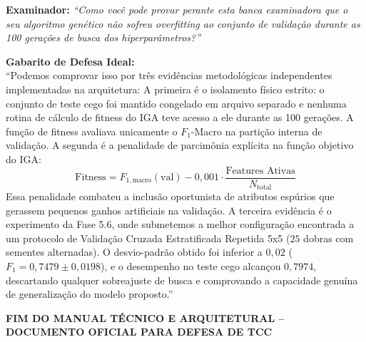 \documentclass[10pt,a4paper]{article}
\begin{document}
\begin{alertbox}
\textbf{Examinador:} \textit{``Como você pode provar perante esta banca examinadora que o seu algoritmo genético não sofreu overfitting ao conjunto de validação durante as 100 gerações de busca dos hiperparâmetros?''}

\textbf{Gabarito de Defesa Ideal:}\\
``Podemos comprovar isso por três evidências metodológicas independentes implementadas na arquitetura:
A primeira é o isolamento físico estrito: o conjunto de teste cego foi mantido congelado em arquivo separado e nenhuma rotina de cálculo de fitness do IGA teve acesso a ele durante as 100 gerações. A função de fitness avaliava unicamente o $F_1$-Macro na partição interna de validação.
A segunda é a penalidade de parcimônia explícita na função objetivo do IGA:
$$\text{Fitness} = F_{1,\text{macro}}(\text{val}) - 0,001 \cdot \frac{\text{Features Ativas}}{N_{\text{total}}}$$
Essa penalidade combateu a inclusão oportunista de atributos espúrios que gerassem pequenos ganhos artificiais na validação.
A terceira evidência é o experimento da Fase 5.6, onde submetemos a melhor configuração encontrada a um protocolo de Validação Cruzada Estratificada Repetida 5x5 ($25$ dobras com sementes alternadas). O desvio-padrão obtido foi inferior a $0,02$ ($F_1 = 0,7479 \pm 0,0198$), e o desempenho no teste cego alcançou $0,7974$, descartando qualquer sobreajuste de busca e comprovando a capacidade genuína de generalização do modelo proposto.''
\end{alertbox}

\vspace{10pt}
\noindent\makebox[\linewidth]{\rule{\textwidth}{1.0pt}}
\begin{center}
  \footnotesize\textsf{\color{NavyBlue}\textbf{FIM DO MANUAL TÉCNICO E ARQUITETURAL -- DOCUMENTO OFICIAL PARA DEFESA DE TCC}}
\end{center}
\end{document}

